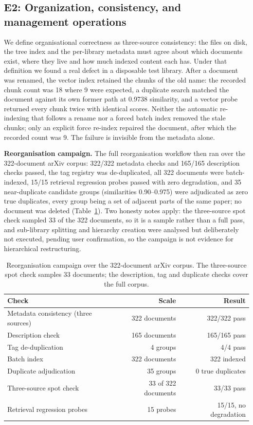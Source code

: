 \subsection{E2: Organization, consistency, and management operations}
\label{sec:e2}

We define organisational correctness as three-source consistency: the files on disk, the tree index and the per-library metadata must agree about which documents exist, where they live and how much indexed content each has. Under that definition we found a real defect in a disposable test library. After a document was renamed, the vector index retained the chunks of the old name: the recorded chunk count was 18 where 9 were expected, a duplicate search matched the document against its own former path at 0.9738 similarity, and a vector probe returned every chunk twice with identical scores. Neither the automatic re-indexing that follows a rename nor a forced batch index removed the stale chunks; only an explicit force re-index repaired the document, after which the recorded count was 9. The failure is invisible from the metadata alone.

\textbf{Reorganisation campaign.} The full reorganisation workflow then ran over the 322-document arXiv corpus: 322/322 metadata checks and 165/165 description checks passed, the tag registry was de-duplicated, all 322 documents were batch-indexed, 15/15 retrieval regression probes passed with zero degradation, and 35 near-duplicate candidate groups (similarities 0.90--0.975) were adjudicated as zero true duplicates, every group being a set of adjacent parts of the same paper; no document was deleted (Table~\ref{tab:org-campaign}). Two honesty notes apply: the three-source spot check sampled 33 of the 322 documents, so it is a sample rather than a full pass, and sub-library splitting and hierarchy creation were analysed but deliberately not executed, pending user confirmation, so the campaign is not evidence for hierarchical restructuring.

\begin{table}[t]
\centering
\small
\setlength{\tabcolsep}{4pt}
\caption{Reorganisation campaign over the 322-document arXiv corpus.
The three-source spot check samples 33 documents; the description, tag and
duplicate checks cover the full corpus.}
\label{tab:org-campaign}
\begin{tabular}{@{}lrr@{}}
\toprule
Check & Scale & Result \\
\midrule
Metadata consistency (three sources) & 322 documents & 322/322 pass \\
Description check & 165 documents & 165/165 pass \\
Tag de-duplication & 4 groups & 4/4 pass \\
Batch index & 322 documents & 322 indexed \\
Duplicate adjudication & 35 groups & 0 true duplicates \\
Three-source spot check & 33 of 322 documents & 33/33 pass \\
Retrieval regression probes & 15 probes & 15/15, no degradation \\
\bottomrule
\end{tabular}
\end{table}

